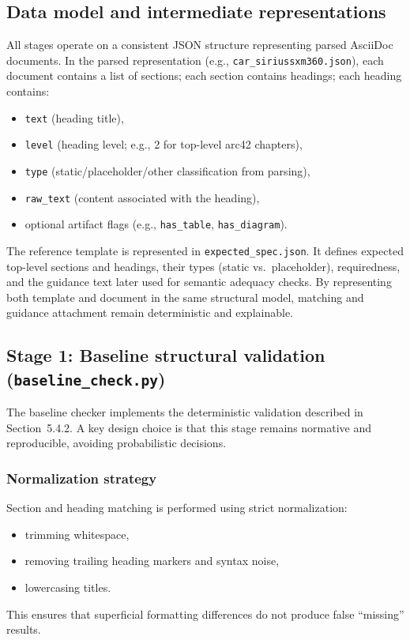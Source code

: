 \subsection{Data model and intermediate representations}
All stages operate on a consistent JSON structure representing parsed AsciiDoc documents. In the parsed representation (e.g., \texttt{car\_siriussxm360.json}), each document contains a list of sections; each section contains headings; each heading contains:
\begin{itemize}
    \item \texttt{text} (heading title),
    \item \texttt{level} (heading level; e.g., 2 for top-level arc42 chapters),
    \item \texttt{type} (static/placeholder/other classification from parsing),
    \item \texttt{raw\_text} (content associated with the heading),
    \item optional artifact flags (e.g., \texttt{has\_table}, \texttt{has\_diagram}).
\end{itemize}

The reference template is represented in \texttt{expected\_spec.json}. It defines expected top-level sections and headings, their types (static vs.\ placeholder), requiredness, and the guidance text later used for semantic adequacy checks. By representing both template and document in the same structural model, matching and guidance attachment remain deterministic and explainable.

\subsection{Stage 1: Baseline structural validation (\texttt{baseline\_check.py})}
The baseline checker implements the deterministic validation described in Section~5.4.2. A key design choice is that this stage remains normative and reproducible, avoiding probabilistic decisions.

\subsubsection{Normalization strategy}
Section and heading matching is performed using strict normalization:
\begin{itemize}
    \item trimming whitespace,
    \item removing trailing heading markers and syntax noise,
    \item lowercasing titles.
\end{itemize}
This ensures that superficial formatting differences do not produce false ``missing'' results.

